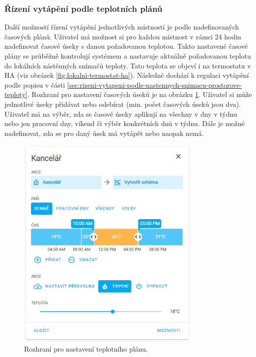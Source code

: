 \subsubsection{Řízení vytápění podle teplotních plánů} 
\label{sec:rizeni-vytapeni-podle-teplotnich-planu}
Další možností řízení vytápění jednotlivých místností je podle nadefinovaných časových plánů. Uživatel má možnost si pro každou místnost v rámci 24 hodin nadefinovat časové úseky s danou požadovanou teplotou. Takto nastavené časové plány se průběžně kontrolují systémem a nastavuje aktuálně požadovanou teplotu do lokálních nástěnných snímačů teploty. Tato teplota se objeví i na termostatu v HA (viz obrázek \ref{fig:lokalni-termostat-ha}). Následně dochází k regulaci vytápění podle popisu v části \ref{sec:rizeni-vytapeni-podle-nastennych-snimacu-prostorove-teploty}. Rozhraní pro nastavení časových úseků je na obrázku \ref{fig:teplotni-plan-ha}. Uživatel si může jednotlivé úseky přidávat nebo odebírat (min. počet časových úseků jsou dva). Uživatel má na výběr, zda se časové úseky aplikují na všechny v dny v týdnu nebo jen pracovní dny, víkend či výběr konkrétních dnů v týdnu. Dále je možné nadefinovat, zda se pro daný úsek má vytápět nebo naopak nemá.

\begin{figure}[H]
    \centering
    \includegraphics[width=0.8\textwidth]{images/software-ha/teplotni-plan-ha.png}
    \caption{Rozhraní pro nastavení teplotního plánu.}
    \label{fig:teplotni-plan-ha}
\end{figure}


